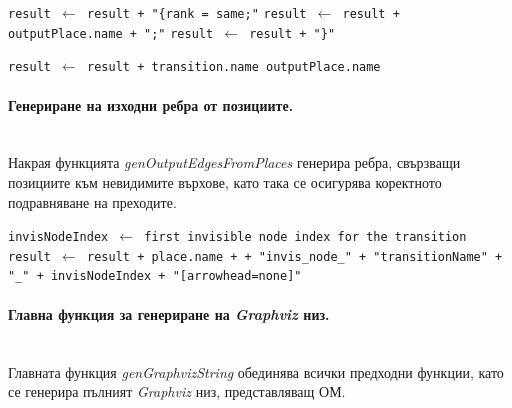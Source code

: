 \begin{algorithm}[H]
\caption{genOutgoingPlacesFromTransition(genNet, result, transition)}
\begin{algorithmic}
\State \texttt{result $\gets$ result + "\{rank = same;"}
    \State \texttt{result $\gets$ result + outputPlace.name + ";"}
\EndFor
\State \texttt{result $\gets$ result + "\}"}
\end{algorithmic}
\end{algorithm}

\begin{algorithm}[H]
\caption{genOutgoingEdgesFromTransition(genNet, result, transition)}
\begin{algorithmic}
    \State \texttt{result $\gets$ result + transition.name  outputPlace.name  }
\EndFor
\end{algorithmic}
\end{algorithm}

\paragraph{Генериране на изходни ребра от позициите.}
\mbox{}\\
Накрая функцията \textit{genOutputEdgesFromPlaces} генерира ребра, свързващи позициите към невидимите върхове, като така се осигурява коректното подравняване на преходите.

\begin{algorithm}[H]
\caption{genOutputEdgesFromPlaces(genNet, result)}
\begin{algorithmic}
    \State \texttt{invisNodeIndex $\gets$ first invisible node index for the transition}
    \State \texttt{result $\gets$ result + place.name +  + "invis\_node\_"{} + "transitionName"{} + "\_"{} + invisNodeIndex + "[arrowhead=none]"}
\EndFor
\end{algorithmic}
\end{algorithm}

\paragraph{Главна функция за генериране на \textit{Graphviz} низ.}
\mbox{}\\
Главната функция \textit{genGraphvizString} обединява всички предходни функции, като се генерира пълният \textit{Graphviz} низ, представляващ ОМ.

